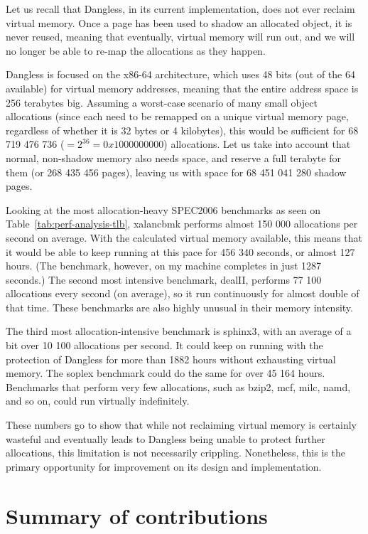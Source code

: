 Let us recall that Dangless, in its current implementation, does not ever reclaim virtual memory. Once a page has been used to shadow an allocated object, it is never reused, meaning that eventually, virtual memory will run out, and we will no longer be able to re-map the allocations as they happen.

Dangless is focused on the x86-64 architecture, which uses 48 bits (out of the 64 available) for virtual memory addresses, meaning that the entire address space is 256 terabytes big. Assuming a worst-case scenario of many small object allocations (since each need to be remapped on a unique virtual memory page, regardless of whether it is 32 bytes or 4 kilobytes), this would be sufficient for 68 719 476 736 ($= 2^{36} = 0x1000000000$) allocations. Let us take into account that normal, non-shadow memory also needs space, and reserve a full terabyte for them (or 268 435 456 pages), leaving us with space for 68 451 041 280 shadow pages.

Looking at the most allocation-heavy SPEC2006 benchmarks as seen on Table~\ref{tab:perf-analysis-tlb}, xalancbmk performs almost 150 000 allocations per second on average. With the calculated virtual memory available, this means that it would be able to keep running at this pace for 456 340 seconds, or almost 127 hours. (The benchmark, however, on my machine completes in just 1287 seconds.) The second most intensive benchmark, dealII, performs 77 100 allocations every second (on average), so it run continuously for almost double of that time. These benchmarks are also highly unusual in their memory intensity.

The third most allocation-intensive benchmark is sphinx3, with an average of a bit over 10 100 allocations per second. It could keep on running with the protection of Dangless for more than 1882 hours without exhausting virtual memory. The soplex benchmark could do the same for over 45 164 hours. Benchmarks that perform very few allocations, such as bzip2, mcf, milc, namd, and so on, could run virtually indefinitely.

These numbers go to show that while not reclaiming virtual memory is certainly wasteful and eventually leads to Dangless being unable to protect further allocations, this limitation is not necessarily crippling. Nonetheless, this is the primary opportunity for improvement on its design and implementation.

\section{Summary of contributions}

